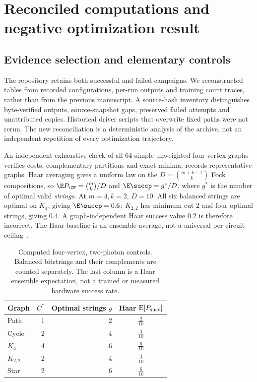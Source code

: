 \section{Reconciled computations and negative optimization result}\label{sec:experiments}
\subsection{Evidence selection and elementary controls}
The repository retains both successful and failed campaigns. We reconstructed tables from recorded configurations, per-run outputs and training count traces, rather than from the previous manuscript. A source-hash inventory distinguishes byte-verified outputs, source-snapshot gaps, preserved failed attempts and unattributed copies. Historical driver scripts that overwrite fixed paths were not rerun. The new reconciliation is a deterministic analysis of the archive, not an independent repetition of every optimization trajectory.

An independent exhaustive check of all $64$ simple unweighted four-vertex graphs verifies costs, complementary partitions and exact minima.  records representative graphs. Haar averaging gives a uniform law on the $D=\binom{m+k-1}{k}$ Fock compositions, so $\E P_{\CF}=\binom{m}{k}/D$ and $\E\succp=g^*/D$, where $g^*$ is the number of optimal valid \emph{strings}. At $m=4,k=2$, $D=10$. All six balanced strings are optimal on $K_4$, giving $\E\succp=0.6$; $K_{2,2}$ has minimum cut $2$ and four optimal strings, giving $0.4$. A graph-independent Haar success value $0.2$ is therefore incorrect. The Haar baseline is an ensemble average, not a universal per-circuit ceiling~\cite{arkhipov2012}.
\begin{table}[t]
\centering
\begin{tabular}{lrrc}
\hline
Graph & $C^*$ & Optimal strings $g$ & Haar $\mathbb{E}[P_{\rm succ}]$ \\
\hline
Path & 1 & 2 & $\frac{2}{10}$ \\
Cycle & 2 & 4 & $\frac{4}{10}$ \\
$K_4$ & 4 & 6 & $\frac{6}{10}$ \\
$K_{2,2}$ & 2 & 4 & $\frac{4}{10}$ \\
Star & 2 & 6 & $\frac{6}{10}$ \\
\hline
\end{tabular}
\caption{Computed four-vertex, two-photon controls. Balanced bitstrings and their complements are counted separately. The last column is a Haar ensemble expectation, not a trained or measured hardware success rate.}
\label{tab:graphs}
\end{table}


